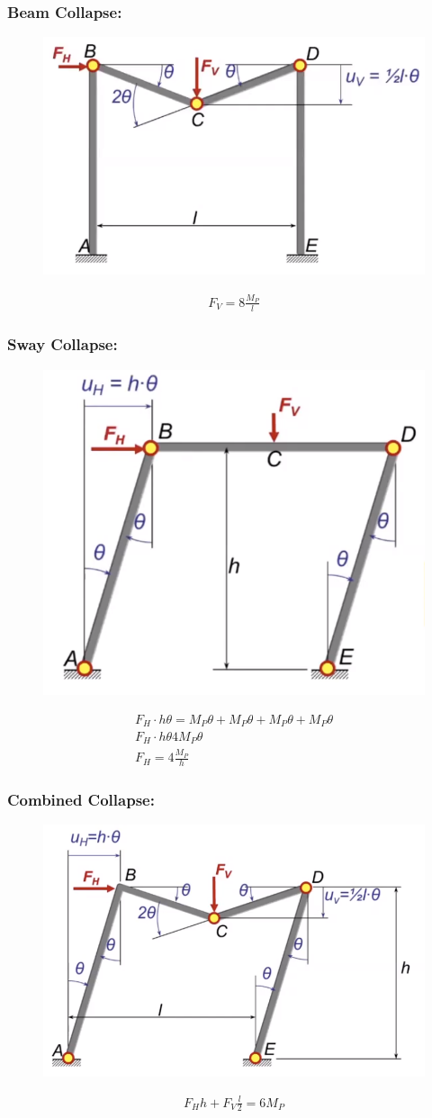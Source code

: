 \documentclass[class=report, crop=false, 12pt,a4paper]{standalone}
\begin{document}
\subsubsection{Beam Collapse:}
\begin{figure}[H]
  \centering
  \includegraphics[width = 0.6 \textwidth]{../img/beam52.PNG}
\end{figure}
\begin{gather}
  F_V = 8\frac{M_P}{l}
\end{gather}
\subsubsection{Sway Collapse:}
\begin{figure}[H]
  \centering
  \includegraphics[width = 0.5 \textwidth]{../img/beam53.PNG}
\end{figure}
\begin{gather}
  F_H \cdot h\theta = M_P\theta + M_P\theta + M_P\theta + M_P\theta \\
  F_H \cdot h\theta 4M_P\theta \\
  F_H = 4\frac{M_P}{h}
\end{gather}
\subsubsection{Combined Collapse:}
\begin{figure}[H]
  \centering
  \includegraphics[width = 0.65 \textwidth]{../img/beam54.PNG}
\end{figure}
\begin{gather}
  F_Hh + F_V\frac{l}{2} = 6M_P
\end{gather}
\end{document}
